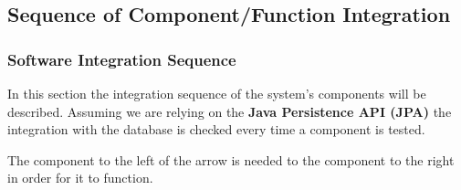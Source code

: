 \subsection{Sequence of Component/Function Integration}

\subsubsection{Software Integration Sequence}
In this section the integration sequence of the system's components will be
described. Assuming we are relying on the
\textbf{Java Persistence API (JPA)} the integration with the database is
checked every time a component is tested.

The component to the left of the arrow is needed to the component to the right
in order for it to function.


